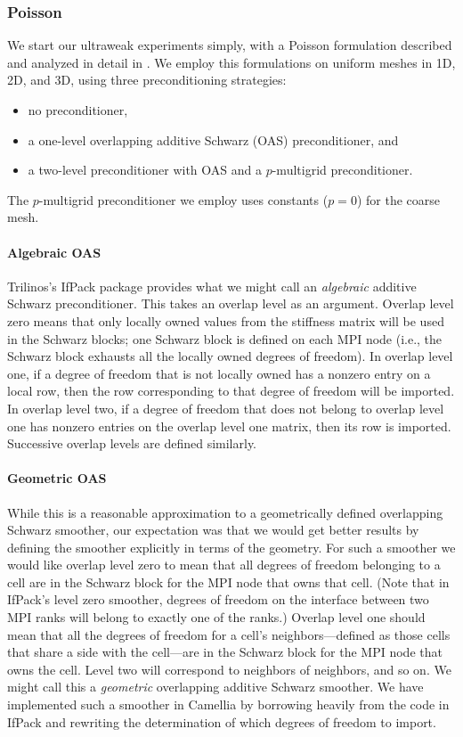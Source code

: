 
\subsubsection{Poisson}
We start our ultraweak experiments simply, with a Poisson formulation described and analyzed in detail in \cite{DPG6}.  We employ this formulations on uniform meshes in 1D, 2D, and 3D, using three preconditioning strategies:
\begin{itemize}
\item no preconditioner,
\item a one-level overlapping additive Schwarz (OAS) preconditioner, and
\item a two-level preconditioner with OAS and a $p$-multigrid preconditioner.
\end{itemize}
The $p$-multigrid preconditioner we employ uses constants ($p=0$) for the coarse mesh.

\paragraph{Algebraic OAS} Trilinos's IfPack package provides what we might call an \emph{algebraic} additive Schwarz preconditioner.  This takes an overlap level as an argument.  Overlap level zero means that only locally owned values from the stiffness matrix will be used in the Schwarz blocks; one Schwarz block is defined on each MPI node (i.e., the Schwarz block exhausts all the locally owned degrees of freedom).  In overlap level one, if a degree of freedom that is not locally owned has a nonzero entry on a local row, then the row corresponding to that degree of freedom will be imported.  In overlap level two, if a degree of freedom that does not belong to overlap level one has nonzero entries on the overlap level one matrix, then its row is imported.  Successive overlap levels are defined similarly.

\paragraph{Geometric OAS} While this is a reasonable approximation to a geometrically defined overlapping Schwarz smoother, our expectation was that we would get better results by defining the smoother explicitly in terms of the geometry.  For such a smoother we would like overlap level zero to mean that all degrees of freedom belonging to a cell are in the Schwarz block for the MPI node that owns that cell.  (Note that in IfPack's level zero smoother, degrees of freedom on the interface between two MPI ranks will belong to exactly one of the ranks.)  Overlap level one should mean that all the degrees of freedom for a cell's neighbors---defined as those cells that share a side with the cell---are in the Schwarz block for the MPI node that owns the cell.  Level two will correspond to neighbors of neighbors, and so on.  We might call this a \emph{geometric} overlapping additive Schwarz smoother.  We have implemented such a smoother in Camellia by borrowing heavily from the code in IfPack and rewriting the determination of which degrees of freedom to import.\\

